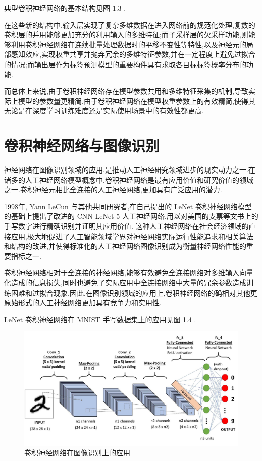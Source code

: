 典型卷积神经网络的基本结构见图 1.3 .

在这些新的结构中,输入层实现了复杂多维数据在进入网络前的规范化处理,复数的卷积层的并用能够更加充分的利用输入的多维特征;而子采样层的欠采样功能,则能够利用卷积神经网络在连续批量处理数据时的平移不变性等特性,以及神经元的局部感知效应,实现权重共享并抛弃冗余的多维特征参数\cite{cnnyoushi3},并在一定程度上避免过拟合的情况;而输出层作为标签预测模型的重要构件具有求取各目标标签概率分布的功能.

而总体上来说,由于卷积神经网络存在模型参数共用和多维特征采集的机制,导致实际上模型的参数量更精简.由于卷积神经网络在模型权重参数上的有效精简,使得其无论是在深度学习训练难度还是实际使用场景中的有效性都更高\cite{cnnyoushi}.

\section{卷积神经网络与图像识别}

神经网络在图像识别领域的应用,是推动人工神经研究领域进步的现实动力之一.在诸多的人工神经网络模型概念中,卷积神经网络是最有应用价值和研究价值的领域之一.卷积神经元相比全连接的人工神经网络,更加具有广泛应用的潜力.

1998年, Yann LeCun 与其他共同研究者,在自己提出的 LeNet 卷积神经网络模型的基础上提出了改进的 CNN LeNet-5 人工神经网络,用以对美国的支票等文书上的手写数字进行精确识别\cite{lenet5use}并证明其应用价值.
这种人工神经网络在社会经济领域的直接应用,极大地促进了人工智能领域学界对神经网络实际运行性能追求和相关算法和结构的改进,并使得标准化的人工神经网络图像识别成为衡量神经网络性能的重要指标之一.

卷积神经网络相对于全连接的神经网络,能够有效避免全连接网络对多维输入向量化造成的信息损失,同时也避免了实际应用中全连接网络中大量的冗余参数造成训练困难和过拟合现象.因此,在图像识别领域的应用上,卷积神经网络的确相对其他更原始形式的人工神经网络更加具有竞争力和实用性.

LeNet 卷积神经网络在 MNIST 手写数据集上的应用见图 1.4 .

\begin{figure}
	\centering
	\includegraphics[scale=0.2]{Figures/CNN2.jpg}
	\caption{卷积神经网络在图像识别上的应用}
\end{figure}

